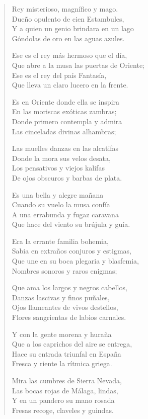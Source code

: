 \documentclass[12pt]{article}
\begin{document}
\begin{verse}
Rey misterioso, magnífico y mago.\\
Dueño opulento de cien Estambules,\\
Y a quien un genio brindara en un lago\\
Góndolas de oro en las aguas azules.  

Ese es el rey más hermoso que el día,\\
Que abre a la musa las puertas de Oriente;\\
Ese es el rey del país Fantasía,\\
Que lleva un claro lucero en la frente.  

Es en Oriente donde ella se inspira\\
En las moriscas exóticas zambras;\\
Donde primero contempla y admira\\
Las cinceladas divinas alhambras;  

Las muelles danzas en las alcatifas\\
Donde la mora sus velos desata,\\
Los pensativos y viejos kalifas\\
De ojos obscuros y barbas de plata.  

Es una bella y alegre mañana\\
Cuando su vuelo la musa confía\\
A una errabunda y fugaz caravana\\
Que hace del viento su brújula y guía.  

Era la errante familia bohemia,\\
Sabia en extraños conjuros y estigmas,\\
Que une en su boca plegaria y blasfemia,\\
Nombres sonoros y raros enigmas;  

Que ama los largos y negros cabellos,\\
Danzas lascivas y finos puñales,\\
Ojos llameantes de vivos destellos,\\
Flores sangrientas de labios carnales.  

Y con la gente morena y huraña\\
Que a los caprichos del aire se entrega,\\
Hace su entrada triunfal en España\\
Fresca y riente la rítmica griega.  

Mira las cumbres de Sierra Nevada,\\
Las bocas rojas de Málaga, lindas,\\
Y en un pandero su mano rosada\\
Fresas recoge, claveles y guindas.  


\end{verse}
\end{document}
